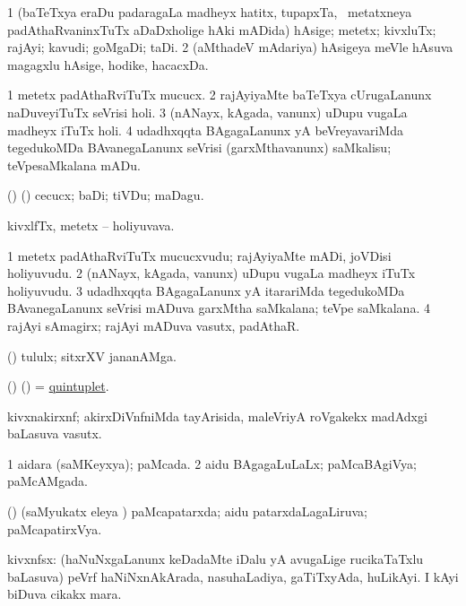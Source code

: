 \bentry
{}
\gl{\nA}
\bmng
\bnum
\num{1} (baTeTxya eraDu padaragaLa madheyx hatitx, tupapxTa, \mo\ metatxneya padAthaRvaninxTuTx aDaDxholige hAki mADida) hAsige; metetx; kivxluTx; rajAyi; kavudi; goMgaDi; taDi. 
\num{2} (aMthadeV mAdariya) hAsigeya meVle hAsuva magagxlu hAsige, hodike, hacacxDa. 
\enum
\emng
\eentry

\bentry
{}
\gl{\sakirx}
\expl{}
\bmng
\bnum
\num{1} metetx padAthaRviTuTx mucucx. 
\num{2} rajAyiyaMte baTeTxya cUrugaLanunx naDuveyiTuTx seVrisi holi. 
\num{3} (nANayx, kAgada, \mo vanunx) uDupu \mo vugaLa madheyx iTuTx holi. 
\num{4} udadhxqqta BAgagaLanunx yA beVreyavariMda tegedukoMDa BAvanegaLanunx seVrisi (garxMthavanunx) saMkalisu; teVpesaMkalana mADu. 
\enum
\emng
\eentry

\bentry
{}
\gl{\sakirx}
\expl{}
\bmng
(\AseTxrXV) (\ashi) cecucx; baDi; tiVDu; maDagu. 
\emng
\eentry

\bentry
{}
\gl{\nA}
\bmng
kivxlfTx, metetx -- holiyuvava. 
\emng
\eentry

\bentry
{}
\gl{\nA}
\bmng
\bnum
\num{1} metetx padAthaRviTuTx mucucxvudu; rajAyiyaMte mADi, joVDisi holiyuvudu. 
\num{2} (nANayx, kAgada, \mo vanunx) uDupu \mo vugaLa madheyx iTuTx holiyuvudu. 
\num{3} udadhxqqta BAgagaLanunx yA itarariMda tegedukoMDa BAvanegaLanunx seVrisi mADuva garxMtha saMkalana; teVpe saMkalana. 
\num{4} rajAyi sAmagirx; rajAyi mADuva vasutx, padAthaR. 
\enum
\emng
\eentry

\bentry
{}
\gl{\nA}
\expl{}
\bmng
(\ashi) tululx; sitxrXV jananAMga. 
\emng
\eentry

\bentry
{}
\gl{\nA}
\expl{}
\bmng
(\birx) (\AmA) = \hyperlink{quintuplet}{quintuplet}. 
\emng
\eentry

\bentry
{}
\gl{\nA}
\bmng
kivxnakirxnf; akirxDiVnfniMda tayArisida, maleVriyA roVgakekx madAdxgi baLasuva vasutx. 
\emng
\eentry

\bentry
{}
\gl{\gu}
\bmng
\bnum
\num{1} aidara (saMKeyxya); paMcada. 
\num{2} aidu BAgagaLuLaLx; paMcaBAgiVya; paMcAMgada. 
\enum
\emng
\eentry

\bentry
{}
\gl{\gu}
\bmng
(\savi) (saMyukatx eleya \vi) paMcapatarxda; aidu patarxdaLagaLiruva; paMcapatirxVya. 
\emng
\eentry

\bentry
{}
\gl{\nA}
\bmng
kivxnfsx: 
\banum
{} (haNuNxgaLanunx keDadaMte iDalu yA avugaLige rucikaTaTxlu baLasuva) peVrf haNiNxnAkArada, nasuhaLadiya, gaTiTxyAda, huLikAyi. 
 I kAyi biDuva cikakx mara. 
\eanum
\emng
\eentry

